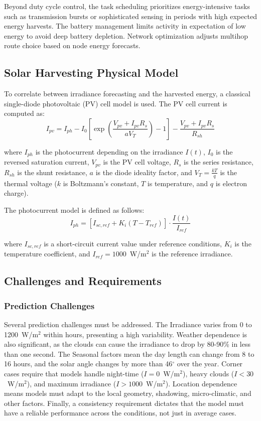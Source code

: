 \documentclass[journal]{IEEEtran}
\begin{document}
Beyond duty cycle control, the task scheduling prioritizes energy-intensive tasks such as transmission bursts or sophisticated sensing in periods with high expected energy harvests. The battery management limits activity in expectation of low energy to avoid deep battery depletion. Network optimization adjusts multihop route choice based on node energy forecasts.

\subsection{Solar Harvesting Physical Model}

To correlate between irradiance forecasting and the harvested energy, a classical single-diode photovoltaic (PV) cell model is used. The PV cell current is computed as:\cite{ref8}
\begin{equation}
I_{pv} = I_{ph} - I_0\left[\exp\left(\frac{V_{pv}+I_{pv}R_s}{a V_T}\right) - 1\right]
- \frac{V_{pv} + I_{pv}R_s}{R_{sh}}
\end{equation}

where $I_{ph}$ is the photocurrent depending on the irradiance $I(t)$, $I_0$ is the reversed saturation current, $V_{pv}$ is the PV cell voltage, $R_s$ is the series resistance, $R_{sh}$ is the shunt resistance, $a$ is the diode ideality factor, and $V_T = \frac{kT}{q}$ is the thermal voltage ($k$ is Boltzmann's constant, $T$ is temperature, and $q$ is electron charge).

The photocurrent model is defined as follows:
\begin{equation}
I_{ph} = [I_{sc,ref} + K_i(T - T_{ref})] \cdot \frac{I(t)}{I_{ref}}
\end{equation}

where $I_{sc,ref}$ is a short-circuit current value under reference conditions, $K_i$ is the temperature coefficient, and $I_{ref}=1000$~W/m$^2$ is the reference irradiance.

\subsection{Challenges and Requirements}

\subsubsection{Prediction Challenges}
Several prediction challenges must be addressed. The Irradiance varies from 0 to 1200~W/m$^2$ within hours, presenting a high variability. Weather dependence is also significant, as the clouds can cause the irradiance to drop by 80-90\% in less than one second. The Seasonal factors mean the day length can change from 8 to 16 hours, and the solar angle changes by more than 46$^\circ$ over the year. Corner cases require that models handle night-time ($I = 0$~W/m$^2$), heavy clouds ($I < 30$~W/m$^2$), and maximum irradiance ($I > 1000$~W/m$^2$). Location dependence means models must adapt to the local geometry, shadowing, micro-climatic, and other factors. Finally, a consistency requirement dictates that the model must have a reliable performance across the conditions, not just in average cases.
\end{document}
